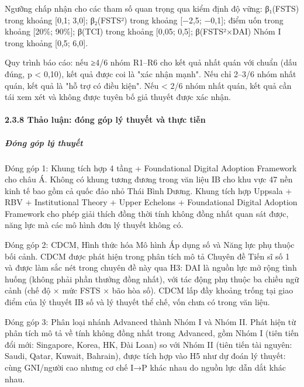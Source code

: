 \documentclass[12pt,a4paper]{article}
\begin{document}
Ngưỡng chấp nhận cho các tham số quan trọng qua kiểm định độ vững:
β₁(FSTS) trong khoảng {[}0,1; 3,0{]}; β₂(FSTS²) trong khoảng {[}−2,5;
−0,1{]}; điểm uốn trong khoảng {[}20\%; 90\%{]}; β(TCI) trong khoảng
{[}0,05; 0,5{]}; β(FSTS²×DAI) Nhóm I trong khoảng {[}0,5; 6,0{]}.

Quy trình báo cáo: nếu ≥4/6 nhóm R1--R6 cho kết quả nhất quán với chuẩn
(dấu đúng, p \textless{} 0,10), kết quả được coi là "xác nhận mạnh". Nếu
chỉ 2--3/6 nhóm nhất quán, kết quả là "hỗ trợ có điều kiện". Nếu
\textless{} 2/6 nhóm nhất quán, kết quả cần tái xem xét và không được
tuyên bố giả thuyết được xác nhận.

\hypertarget{238-thux1ea3o-luux1eadn-ux111uxf3ng-guxf3p-luxfd-thuyux1ebft-vuxe0-thux1ef1c-tiux1ec5n}{%
\paragraph{2.3.8 Thảo luận: đóng góp lý thuyết và thực
tiễn}\label{238-thux1ea3o-luux1eadn-ux111uxf3ng-guxf3p-luxfd-thuyux1ebft-vuxe0-thux1ef1c-tiux1ec5n}}

\hypertarget{ux111uxf3ng-guxf3p-luxfd-thuyux1ebft}{%
\subparagraph{Đóng góp lý
thuyết}\label{ux111uxf3ng-guxf3p-luxfd-thuyux1ebft}}

Đóng góp 1: Khung tích hợp 4 tầng + Foundational Digital Adoption
Framework cho châu Á. Không có khung tương đương trong văn liệu IB cho
khu vực 47 nền kinh tế bao gồm cả quốc đảo nhỏ Thái Bình Dương. Khung
tích hợp Uppsala + RBV + Institutional Theory + Upper Echelons +
Foundational Digital Adoption Framework cho phép giải thích đồng thời
tính không đồng nhất quan sát được, năng lực mà các mô hình đơn lý
thuyết không có.

Đóng góp 2: CDCM, Hình thức hóa Mô hình Áp dụng số và Năng lực phụ thuộc
bối cảnh. CDCM được phát hiện trong phân tích mô tả Chuyên đề Tiến sĩ số
1 và được làm sắc nét trong chuyên đề này qua H3: DAI là nguồn lực mở
rộng tình huống (không phải phần thưởng đồng nhất), với tác động phụ
thuộc ba chiều ngữ cảnh (chế độ × mức FSTS × bão hòa số). CDCM lấp đầy
khoảng trống tại giao điểm của lý thuyết IB số và lý thuyết thể chế, vốn
chưa có trong văn liệu.

Đóng góp 3: Phân loại nhánh Advanced thành Nhóm I và Nhóm II. Phát hiện
từ phân tích mô tả về tính không đồng nhất trong Advanced, gồm Nhóm I
(tiên tiến đổi mới: Singapore, Korea, HK, Đài Loan) so với Nhóm II (tiên
tiến tài nguyên: Saudi, Qatar, Kuwait, Bahrain), được tích hợp vào H5
như dự đoán lý thuyết: cùng GNI/người cao nhưng cơ chế I→P khác nhau do
nguồn lực dẫn dắt khác nhau.
\end{document}
